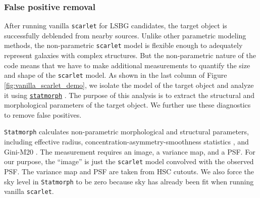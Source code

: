 \documentclass[twocolumn,astrosymb,twocolappendix]{aastex631}
\newcommand{\code}[1]{\texttt{#1}}
\begin{document}
\begin{CJK*}{UTF8}{gbsn}

\subsubsection{False positive removal}\label{sec:non-par-measurement}



After running vanilla \code{scarlet} for LSBG candidates, the target object is successfully deblended from nearby sources. Unlike other parametric modeling methods, the non-parametric \code{scarlet} model is flexible enough to adequately represent galaxies with complex structures. But the non-parametric nature of the code means that we have to make additional measurements to quantify the size and shape of the \code{scarlet} model. As shown in the last column of Figure \ref{fig:vanilla_scarlet_demo}, we isolate the model of the target object and analyze it using \href{https://statmorph.readthedocs.io/en/latest/}{\code{statmorph}} \citep{statmorph}. The purpose of this analysis is to extract the structural and morphological parameters of the target object. We further use these diagnostics to remove false positives. 

\code{Statmorph} calculates non-parametric morphological and structural parameters, including effective radius, concentration-asymmetry-smoothness statistics \citep[CAS,][]{Conselice2003}, and Gini-M20 \citep{Abraham2003,Lotz2004}. The measurement requires an image, a variance map, and a PSF. For our purpose, the ``image'' is just the \code{scarlet} model convolved with the observed PSF. The variance map and PSF are taken from HSC cutouts. We also force the sky level in \code{Statmorph} to be zero because sky has already been fit when running vanilla \code{scarlet}. 


\end{CJK*}
\end{document}
